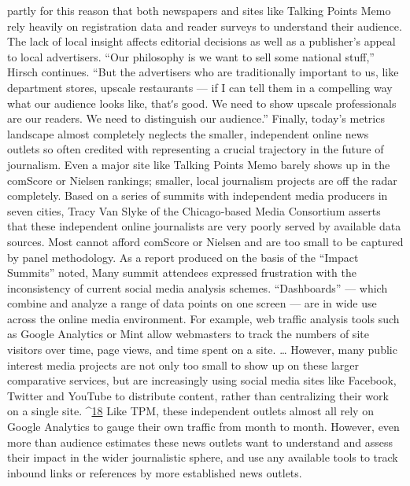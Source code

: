partly for this reason that both newspapers and sites like Talking Points
Memo rely heavily on registration data and reader surveys to understand
their audience.
The lack of local insight affects editorial decisions as well as a publisher’s
appeal to local advertisers. ``Our philosophy is we want to sell some
national stuff,'' Hirsch continues. ``But the advertisers who are
traditionally important to us, like department stores, upscale restaurants
— if I can tell them in a compelling way what our audience looks like,
thatʹs good. We need to show upscale professionals are our readers. We
need to distinguish our audience.''
Finally, today’s metrics landscape almost completely neglects the smaller,
independent online news outlets so often credited with representing a
crucial trajectory in the future of journalism. Even a major site like Talking
Points Memo barely shows up in the comScore or Nielsen rankings;
smaller, local journalism projects are off the radar completely.
Based on a series of summits with independent media producers in seven
cities, Tracy Van Slyke of the Chicago‐based Media Consortium asserts
that these independent online journalists are very poorly served by
available data sources. Most cannot afford comScore or Nielsen and are
too small to be captured by panel methodology. As a report produced on
the basis of the ``Impact Summits'' noted,
Many summit attendees expressed frustration with the
inconsistency of current social media analysis schemes.
``Dashboards'' — which combine and analyze a range of data
points on one screen — are in wide use across the online media
environment. For example, web traffic analysis tools such as
Google Analytics or Mint allow webmasters to track the numbers of
site visitors over time, page views, and time spent on a site. \ldots 
However, many public interest media projects are not only too
small to show up on these larger comparative services, but are
increasingly using social media sites like Facebook, Twitter and
YouTube to distribute content, rather than centralizing their work
on a single site. ^{\href{#endnotes}{18}}
Like TPM, these independent outlets almost all rely on Google Analytics
to gauge their own traffic from month to month. However, even more
than audience estimates these news outlets want to understand and assess
their impact in the wider journalistic sphere, and use any available tools to
track inbound links or references by more established news outlets.

